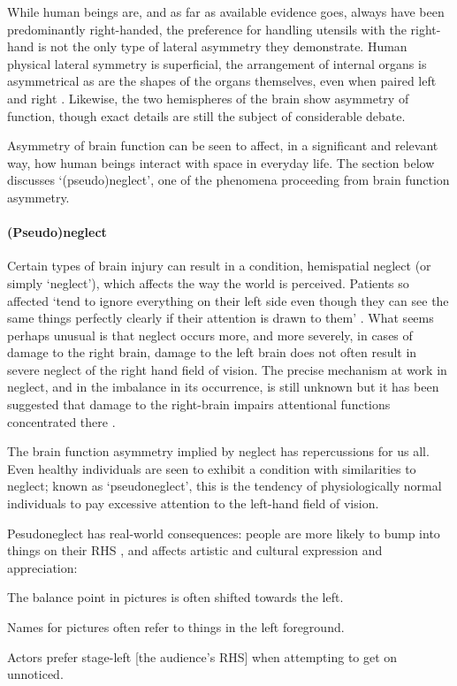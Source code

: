 \documentclass[11pt, oneside, a4paper]{scrartcl}
\newenvironment{close_item}{
\begin{itemize}
 \setlength{\itemsep}{1pt}
 \setlength{\parskip}{1pt}
 \setlength{\parsep}{0pt}}{\end{itemize}
}
\begin{document}
While human beings are, and as far as available evidence goes, always have been predominantly right-handed, the preference for handling utensils with the right-hand is not the only type of lateral asymmetry they demonstrate. Human physical lateral symmetry is superficial, the arrangement of internal organs is asymmetrical as are the shapes of the organs themselves, even when paired left and right \citep[84]{McManus:2002}. Likewise, the two hemispheres of the brain show asymmetry of function, though exact details are still the subject of considerable debate.

Asymmetry of brain function can be seen to affect, in a significant and relevant way, how human beings interact with space in everyday life. The section below discusses `(pseudo)neglect', one of the phenomena proceeding from brain function asymmetry.

\paragraph{(Pseudo)neglect}%
Certain types of brain injury can result in a condition, hemispatial neglect (or simply `neglect'), which affects the way the world is perceived. Patients so affected `tend to ignore everything on their left side even though they can see the same things perfectly clearly if their attention is drawn to them' \citep[303]{Ramachandran:1999}. What seems perhaps unusual is that neglect occurs more, and more severely, in cases of damage to the right brain, damage to the left brain does not often result in severe neglect of the right hand field of vision. The precise mechanism at work in neglect, and in the imbalance in its occurrence, is still unknown but it has been suggested that damage to the right-brain impairs attentional functions concentrated there \citep[199--203]{Springer:1997}. 

The brain function asymmetry implied by neglect has repercussions for us all. Even healthy individuals are seen to exhibit a condition with similarities to neglect; known as `pseudoneglect', this is the tendency of physiologically normal individuals to pay excessive attention to the left-hand field of vision.

Pesudoneglect has real-world consequences: people are more likely to bump into things on their RHS \citep{Turnbull:1998}, and affects artistic and cultural expression and appreciation:
\begin{close_item}
\item The balance point in pictures is often shifted towards the left.
\item Names for pictures often refer to things in the left foreground.
\item Actors prefer stage-left [the audience's RHS] when attempting to get on unnoticed. \citep[193]{McManus:2002}
\end{close_item}
\end{document}
